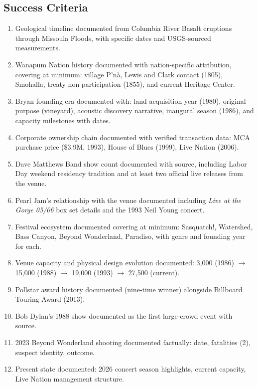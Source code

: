 \documentclass[11pt,letterpaper]{article}
\begin{document}
\subsection{Success Criteria}

\begin{enumerate}
  \item Geological timeline documented from Columbia River Basalt eruptions through Missoula Floods, with specific dates and USGS-sourced measurements.
  \item Wanapum Nation history documented with nation-specific attribution, covering at minimum: village P'n\`a, Lewis and Clark contact (1805), Smohalla, treaty non-participation (1855), and current Heritage Center.
  \item Bryan founding era documented with: land acquisition year (1980), original purpose (vineyard), acoustic discovery narrative, inaugural season (1986), and capacity milestones with dates.
  \item Corporate ownership chain documented with verified transaction data: MCA purchase price (\$3.9M, 1993), House of Blues (1999), Live Nation (2006).
  \item Dave Matthews Band show count documented with source, including Labor Day weekend residency tradition and at least two official live releases from the venue.
  \item Pearl Jam's relationship with the venue documented including \textit{Live at the Gorge 05/06} box set details and the 1993 Neil Young concert.
  \item Festival ecosystem documented covering at minimum: Sasquatch!, Watershed, Bass Canyon, Beyond Wonderland, Paradiso, with genre and founding year for each.
  \item Venue capacity and physical design evolution documented: 3,000 (1986) $\rightarrow$ 15,000 (1988) $\rightarrow$ 19,000 (1993) $\rightarrow$ 27,500 (current).
  \item Pollstar award history documented (nine-time winner) alongside Billboard Touring Award (2013).
  \item Bob Dylan's 1988 show documented as the first large-crowd event with source.
  \item 2023 Beyond Wonderland shooting documented factually: date, fatalities (2), suspect identity, outcome.
  \item Present state documented: 2026 concert season highlights, current capacity, Live Nation management structure.
\end{enumerate}
\end{document}
